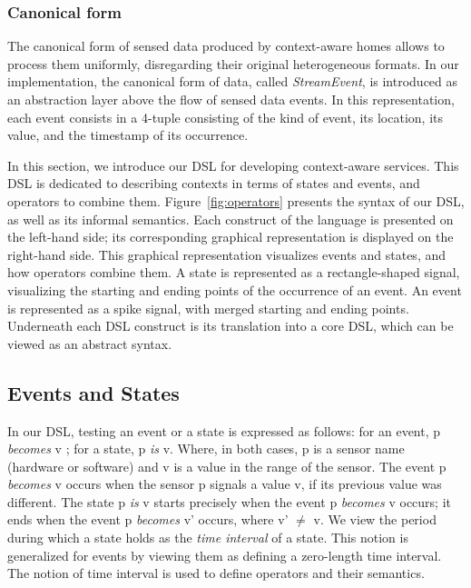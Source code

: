\subsubsection*{Canonical form}
The canonical form of sensed data produced by context-aware homes allows to process them uniformly, disregarding their original heterogeneous formats.  In our implementation, the canonical form of data, called {\em StreamEvent}, is introduced as an abstraction layer above the flow of sensed data events. In this representation, each event consists in a 4-tuple consisting of the kind of event, its location, its value, and the timestamp of its occurrence.



In this section, we introduce our DSL for developing context-aware services. This DSL is dedicated to describing contexts in terms of states and events, and operators to combine them. Figure~\ref{fig:operators}  presents the syntax of our DSL, as well as its informal semantics. Each construct of the language is presented on the left-hand side; its corresponding graphical representation is displayed on the right-hand side. This graphical representation visualizes events and states, and how operators combine them. A state is represented as a rectangle-shaped signal, visualizing the starting and ending points of the occurrence of an event. An event is represented as a spike signal, with merged starting and ending points. Underneath each DSL construct is its translation into a core DSL, which can be viewed as an abstract syntax.

% 

\subsection{Events and States}
In our DSL, testing an event or a state is expressed as follows: for an event, {\ttfamily p {\em becomes} v} ; for a state, {\ttfamily p {\em is} v}. Where, in both cases, {\ttfamily p} is a sensor name (hardware or software) and {\ttfamily v} is a value in the range of the sensor.  The event {\ttfamily p {\em becomes} v} occurs when the sensor {\ttfamily p} signals a value {\ttfamily v}, if its previous value was different. The state {\ttfamily p {\em is} v} starts precisely when the event {\ttfamily p {\em becomes} v} occurs; it ends when the event {\ttfamily p {\em becomes} v'} occurs, where {\ttfamily v'} $\neq$ {\ttfamily v}. We view the period during which a state holds as the {\em time interval} of a state. This notion is generalized for events by viewing them as defining a zero-length time interval. The notion of time interval is used to define operators and their semantics.

